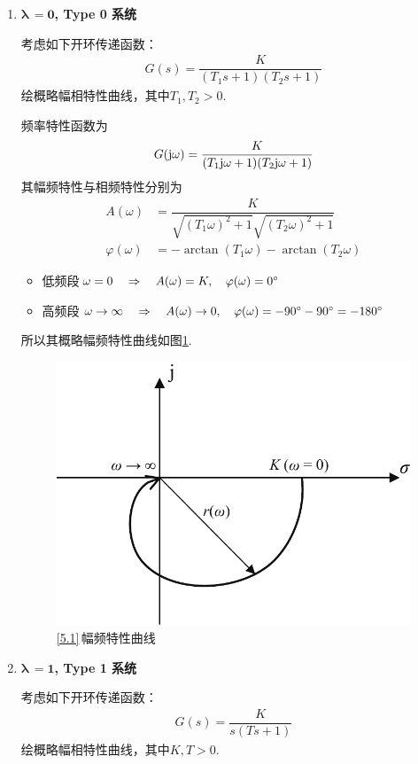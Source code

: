 \begin{enumerate}[1.]
	\item \textbf{$\bm{\lambda}\,  \mathbf{= 0}$, Type 0 系统}
	
	\examples \label{5.1}考虑如下开环传递函数：
	\begin{align*}
		G(s) = \dfrac{K}{(T_1 s + 1)(T_2 s + 1)}
	\end{align*}
	绘概略幅相特性曲线，其中$T_1,T_2 > 0$.
	
	\solve 频率特性函数为
	\begin{align*}
		G(\text{j} \omega) = \dfrac{K}{(T_1 \text{j} \omega + 1)(T_2 \text{j} \omega + 1)}
	\end{align*}
	其幅频特性与相频特性分别为
	\begin{align*}
		A(\omega) &= \dfrac{K}{\sqrt{(T_1 \omega )^2 + 1} \sqrt{(T_2 \omega)^2 + 1}}\\
		\varphi(\omega) &= - \arctan(T_1 \omega) - \arctan(T_2 \omega)
	\end{align*}
\begin{itemize}
	\item 低频段\quad $\omega = 0 \quad \Rightarrow \quad A(\omega) = K,\quad \varphi(\omega) = 0{}^{\circ} $
	
	\item 高频段\quad $\omega \to \infty \quad \Rightarrow \quad A(\omega) \to 0,\quad \varphi(\omega) = -90{}^{\circ} - 90 {}^{\circ} = -180 {}^{\circ}$
\end{itemize}
所以其概略幅频特性曲线如图\ref{F5.1}.
\begin{figure}[!htb]
	\centering
	\includegraphics[width=0.45\linewidth]{pic/5.1.pdf}
	\caption{\ref{5.1}$\,$幅频特性曲线}
	\label{F5.1}
\end{figure}

\item \textbf{$\bm{\lambda}\,  \mathbf{= 1}$, Type 1 系统}

\examples \label{5.2}考虑如下开环传递函数：
\begin{align*}
	G(s) = \dfrac{K}{s(T s + 1)}
\end{align*}
绘概略幅相特性曲线，其中$K,T > 0$.


\end{enumerate}
